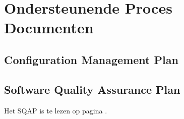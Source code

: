\section{Ondersteunende Proces Documenten}

\subsection{Configuration Management Plan}
\subsection{Software Quality Assurance Plan}
Het SQAP is te lezen op pagina \pageref{sec:SQAP}.